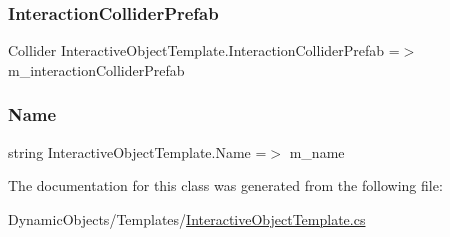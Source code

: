 \subsubsection{\texorpdfstring{Interaction\+Collider\+Prefab}{InteractionColliderPrefab}}
{\footnotesize\ttfamily Collider Interactive\+Object\+Template.\+Interaction\+Collider\+Prefab =$>$ m\+\_\+interaction\+Collider\+Prefab}

\mbox{\label{class_interactive_object_template_a19d385a907f2c9be1a393b25c0ef61ba}} 
\subsubsection{\texorpdfstring{Name}{Name}}
{\footnotesize\ttfamily string Interactive\+Object\+Template.\+Name =$>$ m\+\_\+name}



The documentation for this class was generated from the following file\+:\begin{DoxyCompactItemize}
\item 
Dynamic\+Objects/\+Templates/\mbox{\hyperlink{_interactive_object_template_8cs}{Interactive\+Object\+Template.\+cs}}\end{DoxyCompactItemize}
